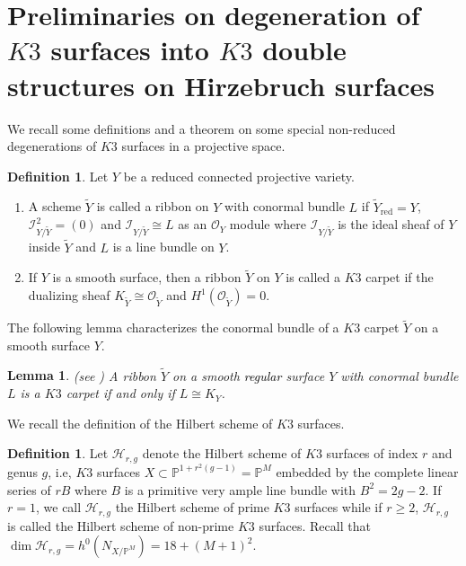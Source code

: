 \documentclass[11pt,twoside]{amsart}
\theoremstyle{plain}
\numberwithin{equation}{section}
\newtheorem{lemma}[theorem]{Lemma}
\theoremstyle{definition}
\newtheorem{definition}[theorem]{Definition}
\begin{document}
\section{Preliminaries on degeneration of $K3$ surfaces into $K3$ double structures on Hirzebruch surfaces}

We recall some definitions and a theorem on some special non-reduced degenerations of $K3$ surfaces in a projective space.

\begin{definition}\label{ribbon}
Let $Y$ be a reduced connected projective variety.
 \begin{enumerate}
     \item A scheme $\widetilde{Y}$ is called a ribbon on $Y$ with conormal bundle $L$ if $\widetilde{Y}_{\operatorname{red}} = Y$, $\mathcal{I}_{Y/\widetilde{Y}}^2 = (0)$ and $\mathcal{I}_{Y/\widetilde{Y}} \cong L$ as an $\mathcal{O}_Y$ module where $\mathcal{I}_{Y/\widetilde{Y}}$ is the ideal sheaf of $Y$ inside $\widetilde{Y}$ and $L$ is a line bundle on $Y$. 

     \item If $Y$ is a smooth surface, then a ribbon $\widetilde{Y}$ on $Y$ is called a $K3$ carpet if the dualizing sheaf $K_{\widetilde{Y}} \cong \mathcal{O}_{\widetilde{Y}}$ and $H^1(\mathcal{O}_{\widetilde{Y}})= 0$.

\end{enumerate}
\end{definition}  

The following lemma characterizes the conormal bundle of a $K3$ carpet $\widetilde{Y}$ on a smooth surface $Y$.

\begin{lemma}(see \cite[\textcolor{black}{Proposition $1.5$}]{GGP08})
    A ribbon $\widetilde{Y}$ on a smooth \textcolor{black}{regular} surface $Y$ with conormal bundle $L$ is a $K3$ carpet if and only if $L \cong K_Y$.
\end{lemma}

\color{black}
We recall the definition of the Hilbert scheme of $K3$ surfaces.

\begin{definition}\label{Hilbert schemes of K3 surfaces}
    Let $\mathcal{H}_{r,g}$ denote the Hilbert scheme of $K3$ surfaces of index $r$ and genus $g$, i.e, $K3$ surfaces $X \subset \mathbb{P}^{1+r^2(g-1)} = \mathbb{P}^M$ embedded by the complete linear series of $rB$ where $B$ is a primitive very ample line bundle with $B^2 = 2g-2$. If $r = 1$, we call $\mathcal{H}_{r,g}$ the Hilbert scheme of prime $K3$ surfaces while if $r \geq 2$, $\mathcal{H}_{r,g}$ is called the Hilbert scheme of non-prime $K3$ surfaces. Recall that $\operatorname{dim}\mathcal{H}_{r,g} = h^0(N_{X/\mathbb{P}^M}) =  18+(M+1)^2$.
\end{definition}
\color{black}
\end{document}
